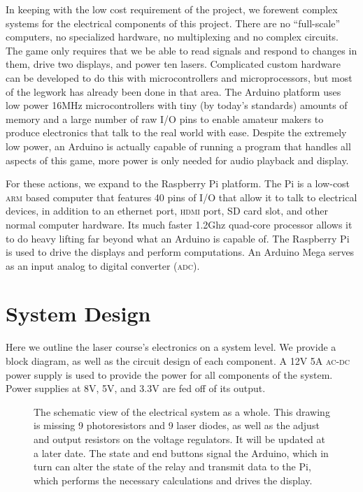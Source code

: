 \documentclass[11pt,oneside,final,letterpaper]{memoir}
\begin{document}
In keeping with the low cost requirement of the project, we forewent complex systems for the electrical components of this project.  There are no ``full-scale'' computers, no specialized hardware, no multiplexing and no complex circuits.  The game only requires that we be able to read signals and respond to changes in them, drive two displays, and power ten lasers.  Complicated custom hardware can be developed to do this with microcontrollers and microprocessors, but most of the legwork has already been done in that area.  The Arduino platform uses low power 16MHz microcontrollers with tiny (by today's standards) amounts of memory and a large number of raw I/O pins to enable amateur makers to produce electronics that talk to the real world with ease.  Despite the extremely low power, an Arduino is actually capable of running a program that handles all aspects of this game, more power is only needed for audio playback and display.

For these actions, we expand to the Raspberry Pi platform.  The Pi is a low-cost \textsc{arm} based computer that features 40 pins of I/O that allow it to talk to electrical devices, in addition to an ethernet port, \textsc{hdmi} port, SD card slot, and other normal computer hardware.  Its much faster 1.2Ghz quad-core processor allows it to do heavy lifting far beyond what an Arduino is capable of.  The Raspberry Pi is used to drive the displays and perform computations.  An Arduino Mega serves as an input analog to digital converter (\textsc{adc}).

\section*{System Design}

Here we outline the laser course's electronics on a system level.  We provide a block diagram, as well as the circuit design of each component.  A 12V 5A \textsc{ac-dc} power supply is used to provide the power for all components of the system.  Power supplies at 8V, 5V, and 3.3V are fed off of its output.

\begin{figure}[H]
        \caption[The schematic view of the entire system.]{
            The schematic view of the electrical system as a whole.  This drawing is missing 9 photoresistors and 9 laser diodes, as well as the adjust and output resistors on the voltage regulators.  It will be updated at a later date.  The state and end buttons signal the Arduino, which in turn can alter the state of the relay and transmit data to the Pi, which performs the necessary calculations and drives the display.
        }
\end{figure}
\end{document}
